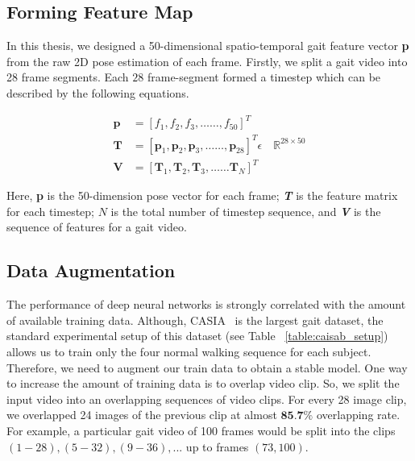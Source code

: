 \subsection{Forming Feature Map}
In this thesis, we designed a 50-dimensional spatio-temporal gait feature vector \textbf{p} from the raw 2D pose estimation of each frame.  Firstly, we split a gait video into 28 frame segments. Each $28$ frame-segment formed a timestep which can be described by the following equations. 

\begin{equation}
\label{equ:feature_preprocess}
\begin{split}
\boldsymbol{p} &= {[f_1, f_2, f_3, \ldots \ldots, f_{50}]}^T \\
\boldsymbol {T} &= {[\boldsymbol p_1, \boldsymbol p_2, \boldsymbol p_3,  \ldots \ldots, \boldsymbol p_{28}]}^T \epsilon \quad \mathbb {R}^{28\times 50}\\
\boldsymbol V &= {[\boldsymbol T_1, \boldsymbol T_2, \boldsymbol T_3,  \ldots \ldots \boldsymbol T_{N}]}^T 
\end{split}
\end{equation}

Here, \textbf{p} is the 50-dimension pose vector for each frame; \textit{\textbf{T}} is the feature matrix for each timestep; $ N $ is the total number of timestep sequence, and \textit{\textbf{V}} is the sequence of features for a gait video. 



\subsection{Data Augmentation}
The performance of deep neural networks is strongly correlated with the amount of available training data. Although, CASIA~\cite{Yu_06} is the largest gait dataset, the standard experimental setup of this dataset (see Table ~\ref{table:caisab_setup}) allows us to train only the four normal walking sequence for each subject. Therefore, we need to augment our train data to obtain a stable model. One way to increase the amount of training data is to overlap video clip. So, we split the input video into an overlapping sequences of video clips. For every 28 image clip, we overlapped 24 images of the previous clip at almost $ \textbf{85.7\%} $ overlapping rate. For example, a particular gait video of 100 frames would be split into the clips $(1-28), (5-32), (9-36), ...$ up to frames $(73, 100)$. 

